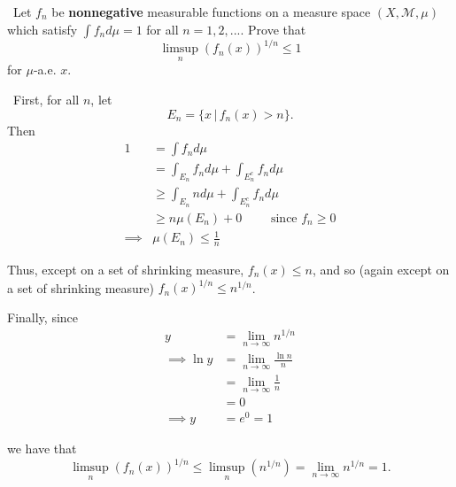 \documentclass[12pt]{Homework}
\begin{document}
\begin{problem} $\,$
Let $f_n$ be \textbf{nonnegative} measurable functions on a measure space $(X,\mathscr{M},\mu)$ which satisfy $\int f_nd\mu=1$ for all $n=1,2,... .$ Prove that $$\limsup_n(f_n(x))^{1/n}\le1$$ for $\mu$-a.e. $x.$
\end{problem}


\begin{solution}$\,$
First, for all $n$, let $$E_n=\{x\,|\,f_n(x)>n\}.$$ Then \begin{align*}
    1&=\int f_nd\mu\\
    &=\int_{E_n}f_nd\mu+\int_{E_n^c}f_nd\mu\\
    &\ge\int_{E_n}nd\mu+\int_{E_n^c}f_nd\mu\\
    &\ge n\mu(E_n)+0\qquad\text{ since }f_n\ge0\\
    \implies&\mu(E_n)\le\frac{1}{n} 
\end{align*}

Thus, except on a set of shrinking measure, $f_n(x)\le n$, and so (again except on a set of shrinking measure) $f_n(x)^{1/n}\le n^{1/n}$.

Finally, since \begin{align*}
    y&=\lim_{n\to\infty}n^{1/n}\\
   \implies \ln y&=\lim_{n\to\infty}\frac{\ln n}{n}\\
    &=\lim_{n\to\infty}\frac{1}{n}\\
    &=0\\
    \implies y&=e^0=1
\end{align*}

we have that $$\limsup_n(f_n(x))^{1/n}\le\limsup_n(n^{1/n})=\lim_{n\to\infty}n^{1/n}=1.$$

\begin{comment}
Let $$g_n=\sup_{k\ge n}(f_k(x))^{1/k}<\infty$$ a.e. since if $f_k(x)$ grows arbitrarily large, this growth must occur on sets of increasingly small measure (since $f_k$ are integrable).  Then, by definition of $\sup$, for all $\varepsilon>0$, there exists some $f_k(x)^{1/k}$ such that $$f_k(x)^{1/k}\ge g_n(x)-\frac{1}{n}.$$

Let $\varepsilon=\frac{1}{n}$ and call $f_{k_n}(x)^{1/k_n}$ the function satisfying the above. 

Now, $$\inf_{n}f_{k_n}(x)^{1/k_n}\ge\inf_n\left(g_n(x)-\frac{1}{n}\right)$$
\end{comment}

\end{solution}
\newpage
\end{document}
